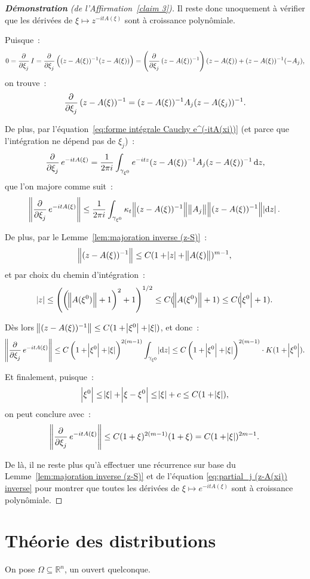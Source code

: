 \documentclass{report}
\newcommand{\R}{{\mathbb R}}
\theoremstyle{definition}
\theoremstyle{remark}
\begin{document}
\begin{proof}[\textnormal {\textbf {Démonstration} (de l'Affirmation~\ref{claim 3})}] Il reste donc unoquement à vérifier que les dérivées de $\xi \mapsto z^{-itA(\xi)}$ sont à
croissance polynômiale.

Puisque~:
\[0 = \dpd {}{\xi_j}I = \dpd {}{\xi_j}\left((z-A(\xi))^{-1}(z-A(\xi))\right) = \left(\dpd {}{\xi_j}(z-A(\xi))^{-1}\right)(z-A(\xi)) + (z-A(\xi))^{-1}(-A_j),\]
on trouve~:
\begin{equation}\label{eq:partial_j (z-A(xi)) inverse}
	\dpd {}{\xi_j}(z-A(\xi))^{-1} = (z-A(\xi))^{-1}A_j(z-A(\xi_j))^{-1}.
\end{equation}

De plus, par l'équation~\eqref{eq:forme intégrale Cauchy e^(-itA(xi))} (et parce que l'intégration ne dépend pas de $\xi_j$)~:
\[\dpd {}{\xi_j}e^{-itA(\xi)} = \frac 1{2\pi i}\int_{\gamma_{\xi^0}}e^{-itz}(z-A(\xi))^{-1}A_j(z-A(\xi))^{-1}\dif z,\]
que l'on majore comme suit~:
\[\norm {\dpd {}{\xi_j}e^{-itA(\xi)}} \leq \frac 1{2\pi i}\int_{\gamma_{\xi^0}}\kappa_t\norm {(z-A(\xi))^{-1}}\norm {A_j}\norm {(z-A(\xi))^{-1}}\abs {\dif z}.\]

De plus, par le Lemme~\ref{lem:majoration inverse (z-S)}~:
\[\norm {(z-A(\xi))^{-1}} \leq C(1+\abs z + \norm {A(\xi)})^{m-1},\]
et par choix du chemin d'intégration~:
\[\abs z \leq \left(\left(\norm {A(\xi^0)} + 1\right)^2 + 1\right)^{1/2} \leq C(\norm {A(\xi^0)}+1) \leq C(\abs {\xi^0}+1).\]

Dès lors $\norm {(z-A(\xi))^{-1}} \leq C(1+\abs {\xi^0}+\abs {\xi})$, et donc~:
\[\norm {\dpd {}{\xi_j}e^{-itA(\xi)}} \leq C\left(1+\abs {\xi^0}+\abs \xi\right)^{2(m-1)}\int_{\gamma_{\xi^0}}\abs {\dif z}
	\leq C\left(1 + \abs {\xi^0} + \abs \xi\right)^{2(m-1)} \cdot K (1+\abs {\xi^0}).\]

Et finalement, puisque~:
\[\abs {\xi^0} \leq \abs \xi + \abs {\xi-\xi^0} \leq \abs \xi + c \leq C(1+\abs \xi),\]
on peut conclure avec~:
\[\norm {\dpd {}{\xi_j}e^{-itA(\xi)}} \leq C(1+\xi)^{2(m-1)}(1+\xi) = C(1+\abs \xi)^{2m-1}.\]

De là, il ne reste plus qu'à effectuer une récurrence sur base du Lemme~\ref{lem:majoration inverse (z-S)} et de l'équation \eqref{eq:partial_j (z-A(xi)) inverse} pour montrer
que toutes les dérivées de $\xi \mapsto e^{-itA(\xi)}$ sont à croissance polynômiale.
\end{proof}

\chapter{Théorie des distributions}
On pose $\Omega \subseteq \R^n$, un ouvert quelconque.
\end{document}
